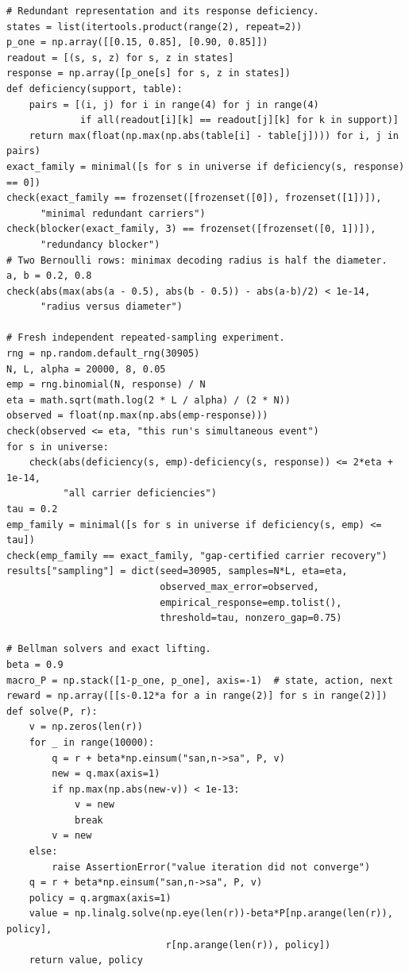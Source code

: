 \documentclass[
  11pt,
  oneside]{book}
\begin{document}
\begin{verbatim}
# Redundant representation and its response deficiency.
states = list(itertools.product(range(2), repeat=2))
p_one = np.array([[0.15, 0.85], [0.90, 0.85]])
readout = [(s, s, z) for s, z in states]
response = np.array([p_one[s] for s, z in states])
def deficiency(support, table):
    pairs = [(i, j) for i in range(4) for j in range(4)
             if all(readout[i][k] == readout[j][k] for k in support)]
    return max(float(np.max(np.abs(table[i] - table[j]))) for i, j in pairs)
exact_family = minimal([s for s in universe if deficiency(s, response) == 0])
check(exact_family == frozenset([frozenset([0]), frozenset([1])]),
      "minimal redundant carriers")
check(blocker(exact_family, 3) == frozenset([frozenset([0, 1])]),
      "redundancy blocker")
# Two Bernoulli rows: minimax decoding radius is half the diameter.
a, b = 0.2, 0.8
check(abs(max(abs(a - 0.5), abs(b - 0.5)) - abs(a-b)/2) < 1e-14,
      "radius versus diameter")

# Fresh independent repeated-sampling experiment.
rng = np.random.default_rng(30905)
N, L, alpha = 20000, 8, 0.05
emp = rng.binomial(N, response) / N
eta = math.sqrt(math.log(2 * L / alpha) / (2 * N))
observed = float(np.max(np.abs(emp-response)))
check(observed <= eta, "this run's simultaneous event")
for s in universe:
    check(abs(deficiency(s, emp)-deficiency(s, response)) <= 2*eta + 1e-14,
          "all carrier deficiencies")
tau = 0.2
emp_family = minimal([s for s in universe if deficiency(s, emp) <= tau])
check(emp_family == exact_family, "gap-certified carrier recovery")
results["sampling"] = dict(seed=30905, samples=N*L, eta=eta,
                           observed_max_error=observed,
                           empirical_response=emp.tolist(),
                           threshold=tau, nonzero_gap=0.75)

# Bellman solvers and exact lifting.
beta = 0.9
macro_P = np.stack([1-p_one, p_one], axis=-1)  # state, action, next
reward = np.array([[s-0.12*a for a in range(2)] for s in range(2)])
def solve(P, r):
    v = np.zeros(len(r))
    for _ in range(10000):
        q = r + beta*np.einsum("san,n->sa", P, v)
        new = q.max(axis=1)
        if np.max(np.abs(new-v)) < 1e-13:
            v = new
            break
        v = new
    else:
        raise AssertionError("value iteration did not converge")
    q = r + beta*np.einsum("san,n->sa", P, v)
    policy = q.argmax(axis=1)
    value = np.linalg.solve(np.eye(len(r))-beta*P[np.arange(len(r)), policy],
                            r[np.arange(len(r)), policy])
    return value, policy


\end{verbatim}
\end{document}

